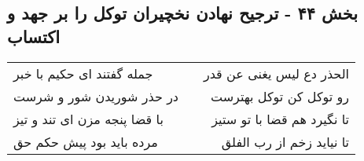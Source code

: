\begin{center}
\section*{بخش ۴۴ - ترجیح نهادن نخچیران توکل را بر جهد و اکتساب}
\label{sec:sh044}
\begin{longtable}{l p{0.5cm} r}
جمله گفتند ای حکیم با خبر
&&
الحذر دع لیس یغنی عن قدر
\\
در حذر شوریدن شور و شرست
&&
رو توکل کن توکل بهترست
\\
با قضا پنجه مزن ای تند و تیز
&&
تا نگیرد هم قضا با تو ستیز
\\
مرده باید بود پیش حکم حق
&&
تا نیاید زخم از رب الفلق
\\
\end{longtable}
\end{center}
